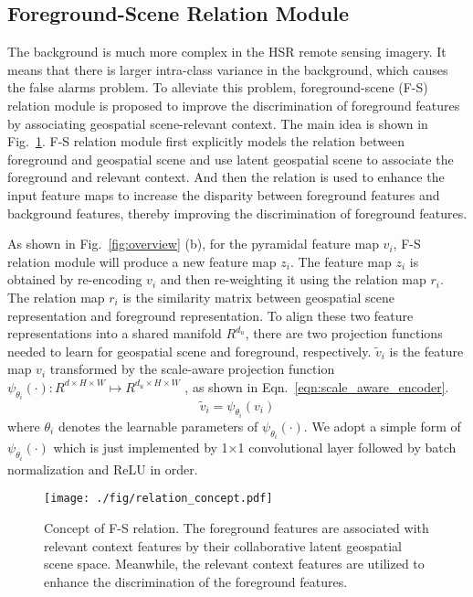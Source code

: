\documentclass[10pt,twocolumn,letterpaper]{article}
\begin{document}
\subsection{Foreground-Scene Relation Module}
\label{sec:relation}
The background is much more complex in the HSR remote sensing imagery.
It means that there is larger intra-class variance in the background, which causes the false alarms problem.
To alleviate this problem, foreground-scene (F-S) relation module is proposed to improve the discrimination of foreground features by associating geospatial scene-relevant context.
The main idea is shown in Fig.~\ref{fig:relation_concept}.
F-S relation module first explicitly models the relation between foreground and geospatial scene and use latent geospatial scene to associate the foreground and relevant context.
And then the relation is used to enhance the input feature maps to increase the disparity  between foreground features and background features, thereby improving the discrimination of foreground features.

As shown in Fig.~\ref{fig:overview} (b), for the pyramidal feature map $v_i$, F-S relation module will produce a new feature map $z_i$.
The feature map $z_i$ is obtained by re-encoding $v_i$ and then re-weighting it using the relation map $r_i$.
The relation map $r_i$ is the similarity matrix between geospatial scene representation and foreground representation.
To align these two feature representations into a shared manifold $R^{d_u}$, there are two projection functions needed to learn for geospatial scene and foreground, respectively.
$\tilde{v}_i$ is the feature map $v_i$ transformed by the scale-aware projection function $\psi_{\theta_i}(\cdot): R^{d\times H\times W} \mapsto R^{d_u\times H\times W}$
, as shown in Eqn.~\ref{eqn:scale_aware_encoder}.
\begin{equation}
   \label{eqn:scale_aware_encoder}
   \tilde{v}_i = \psi_{\theta_i}(v_i)
\end{equation}
where $\theta_i$ denotes the learnable parameters of $\psi_{\theta_i}(\cdot)$.
We adopt a simple form of $\psi_{\theta_i}(\cdot)$ which is just implemented by 1$\times$1 convolutional layer followed by batch normalization and ReLU in order.
\begin{figure}[hbt]
   \begin{center}
      \texttt{[image: ./fig/relation\_concept.pdf]}
   \end{center}
   \caption{Concept of F-S relation.
      The foreground features are associated with relevant context features by their collaborative latent geospatial scene space. Meanwhile, the relevant context features are utilized to enhance the discrimination of the foreground features.}
   \label{fig:relation_concept}
\end{figure}
\end{document}
